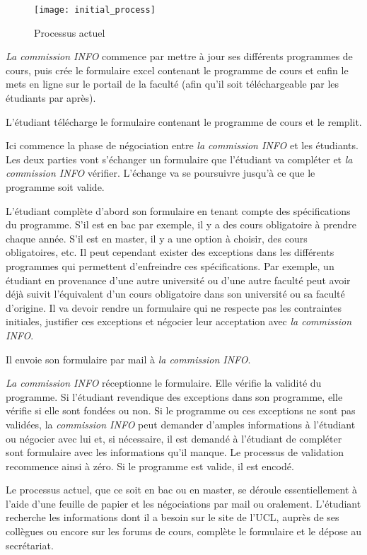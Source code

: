 \begin{figure}
\centering
\caption{Processus actuel}
\texttt{[image: initial\_process]}
\label{fig:initial_process}
\end{figure} 

\textit{La commission INFO} commence par mettre à jour ses différents programmes de cours, puis crée le formulaire excel contenant le programme de cours et enfin le mets en ligne sur le portail de la faculté (afin qu'il soit téléchargeable par les étudiants par après).

L'étudiant télécharge le formulaire contenant le programme de cours et le remplit. 

Ici commence la phase de négociation entre \textit{la commission INFO} et les étudiants. Les deux parties vont s'échanger un formulaire que l'étudiant va compléter et \textit{la commission INFO} vérifier. L'échange va se poursuivre jusqu'à ce que le programme soit valide. 

L'étudiant complète d'abord son formulaire en tenant compte des spécifications du programme. S'il est en bac par exemple, il y a des cours obligatoire à prendre chaque année. S'il est en master, il y a une option à choisir, des cours obligatoires, etc. Il peut cependant exister des exceptions dans les différents programmes qui permettent d'enfreindre ces spécifications. Par exemple, un étudiant en provenance d'une autre université ou d'une autre faculté peut avoir déjà suivit l'équivalent d'un cours obligatoire dans son université ou sa faculté d'origine. Il va devoir rendre un formulaire qui ne respecte pas les contraintes initiales, justifier ces exceptions et négocier leur acceptation avec \textit{la commission INFO}.

Il envoie son formulaire par mail à \textit{la commission INFO}.

\textit{La commission INFO} réceptionne le formulaire. Elle vérifie la validité du programme. Si l'étudiant revendique des exceptions dans son programme, elle vérifie si elle sont fondées ou non. Si le programme ou ces exceptions ne sont pas validées, la \textit{commission INFO} peut demander d'amples informations à l'étudiant ou négocier avec lui et, si nécessaire, il est demandé à l'étudiant de compléter sont formulaire avec les informations qu'il manque. Le processus de validation recommence ainsi à zéro. Si le programme est valide, il est encodé. 

Le processus actuel, que ce soit en bac ou en master, se déroule essentiellement à l'aide d'une feuille de papier et les négociations par mail ou oralement. L'étudiant recherche les informations dont il a besoin sur le site de l'UCL, auprès de ses collègues ou encore sur les forums de cours, complète le formulaire et le dépose au secrétariat.

